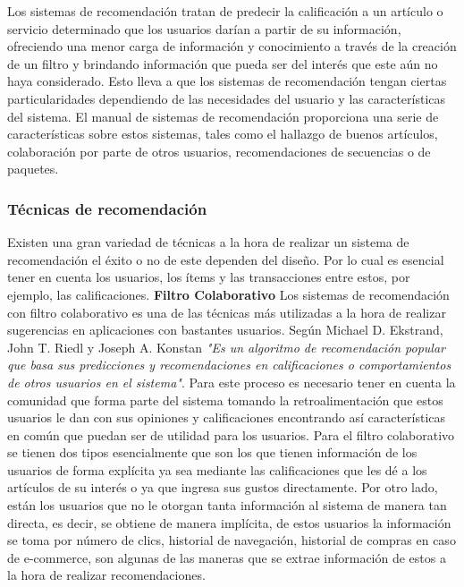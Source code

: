 \documentclass[12pt,letterpaper,openany]{book}
\begin{document}
Los sistemas de recomendación tratan de predecir la calificación a un artículo o servicio determinado que los usuarios darían a partir de su información, ofreciendo una menor carga de información y conocimiento a través de la creación de un filtro y brindando información que pueda ser del interés que este aún no haya considerado\cite{6}. Esto lleva a que los sistemas de recomendación tengan ciertas particularidades dependiendo de las necesidades del usuario y las características del sistema. El manual de sistemas de recomendación\cite{13} proporciona una serie de características sobre estos sistemas, tales como el hallazgo de buenos artículos, colaboración por parte de otros usuarios, recomendaciones de secuencias o de paquetes.

\subsubsection{Técnicas de recomendación}
Existen una gran variedad de técnicas a la hora de realizar un sistema de recomendación el éxito o no de este dependen del diseño. Por lo cual es esencial tener en cuenta los usuarios, los ítems y las transacciones entre estos, por ejemplo, las calificaciones\cite{13}.
\vspace{5mm}\newline
\textbf{Filtro Colaborativo}\newline
Los sistemas de recomendación con filtro colaborativo es una de las técnicas más utilizadas a la hora de realizar sugerencias en aplicaciones con bastantes usuarios. Según Michael D. Ekstrand, John T. Riedl y Joseph A. Konstan \textit{"Es un algoritmo de recomendación popular que basa sus predicciones y recomendaciones en calificaciones o comportamientos de otros usuarios en el sistema"}\cite{14}. Para este proceso es necesario tener en cuenta la comunidad que forma parte del sistema tomando la retroalimentación que estos usuarios le dan con sus opiniones y calificaciones encontrando así características en común que puedan ser de utilidad para los usuarios\cite{15}.
Para el filtro colaborativo se tienen dos tipos esencialmente que son los que tienen información de los usuarios de forma explícita ya sea mediante las calificaciones que les dé a los artículos de su interés o ya que ingresa sus gustos directamente. Por otro lado, están los usuarios que no le otorgan tanta información al sistema de manera tan directa, es decir, se obtiene de manera implícita, de estos usuarios la información se toma por número de clics, historial de navegación, historial de compras en caso de e-commerce, son algunas de las maneras que se extrae información de estos a la hora de realizar recomendaciones\cite{13}.
\end{document}
